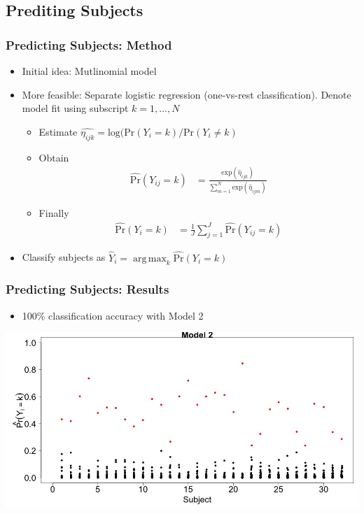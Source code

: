\documentclass[10pt]{beamer}\usepackage[]{graphicx}\usepackage[]{color}
\DeclareMathOperator*{\argmax}{arg\,max}
\begin{document}
\subsection{Prediting Subjects}
\begin{frame}
\frametitle{Predicting Subjects: Method}
\begin{itemize}
\item Initial idea: Mutlinomial model
\item More feasible: Separate logistic regression (one-vs-rest classification). Denote model fit using subscript $k=1,\ldots,N$
    \begin{itemize}
    \item Estimate $\hat{\eta_{ijk}} = \text{log}(\text{Pr}(Y_i = k)/\text{Pr}(Y_i \neq k)$
    \item Obtain 
    \begin{align*}
    \widehat{\text{Pr}}(Y_{ij} = k) &= \frac{\text{exp}(\hat{\eta}_{ijk})}{\sum_{m=1}^N \text{exp}(\hat{\eta}_{ijm})}
    \end{align*}
    \item Finally
    \begin{align*}
    \widehat{\text{Pr}}(Y_{i} = k) &= \frac{1}{J}\sum_{j=1}^J \widehat{\text{Pr}}(Y_{ij} = k) 
    \end{align*}
    \end{itemize}
\item Classify subjects as $\hat{Y}_i = \argmax_{k} \widehat{\text{Pr}}(Y_{i} = k)$
\end{itemize}
\end{frame}






\begin{frame}
\frametitle{Predicting Subjects: Results}
\begin{itemize}
\item 100\% classification accuracy with Model 2
\end{itemize}
\centering
\includegraphics[width=\textwidth]{pred_subjs.jpeg}
\end{frame}
\end{document}
